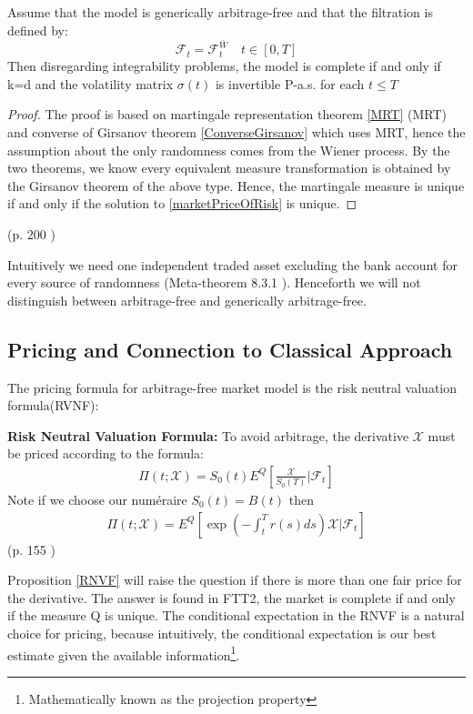 \begin{proposition}{}\label{completeProp}
Assume that the model is generically arbitrage-free and that the filtration is defined by:
$$\mathcal{F}_t=\mathcal{F}_t^{\bar{W}} \quad t \in [0,T]$$
Then disregarding integrability problems, the model is complete if and only if k=d and the volatility matrix $\sigma(t)$ is invertible P-a.s. for each $t \leq T$
\begin{proof}
The proof is based on martingale representation theorem \ref{MRT} (MRT) and converse of Girsanov theorem \ref{ConverseGirsanov} which uses MRT, hence the assumption about the only randomness comes from the Wiener process. By the two theorems, we know every equivalent measure transformation is obtained by the Girsanov theorem of the above type. Hence, the martingale measure is unique if and only if the solution to \eqref{marketPriceOfRisk} is unique.                                        
\end{proof}
\null \hfill (p. 200 \parencite{finKont})
\end{proposition}
Intuitively we need one independent traded asset excluding the bank account for every source of randomness (Meta-theorem 8.3.1 \parencite{finKont}). Henceforth we will not distinguish between arbitrage-free and generically arbitrage-free.


\subsection{Pricing and Connection to Classical Approach}
The pricing formula for arbitrage-free market model is the risk neutral valuation formula(RVNF):
\begin{proposition}{\textbf{Risk Neutral Valuation Formula: }}\label{RNVF}
To avoid arbitrage, the derivative $\mathcal{X}$ must be priced according to the formula:
\begin{align}
\Pi(t;\mathcal{X})=S_0(t)E^Q[\frac{\mathcal{X}}{S_0(T)}|\mathcal{F}_t]
\end{align}
Note if we choose our numéraire $S_0(t)=B(t)$ then
\begin{align}
\Pi(t;\mathcal{X})=E^Q[\exp(-\int_t^T r(s) ds) \mathcal{X}|\mathcal{F}_t]
\end{align}
\null \hfill(p. 155 \parencite{finKont})
\end{proposition}
Proposition \ref{RNVF} will raise the question if there is more than one fair price for the derivative. The answer is found in FTT2, the market is complete if and only if the measure Q is unique. The conditional expectation in the RNVF is a natural choice for pricing, because intuitively, the conditional expectation is our best estimate given the available information\footnote{Mathematically known as the projection property}.\\

